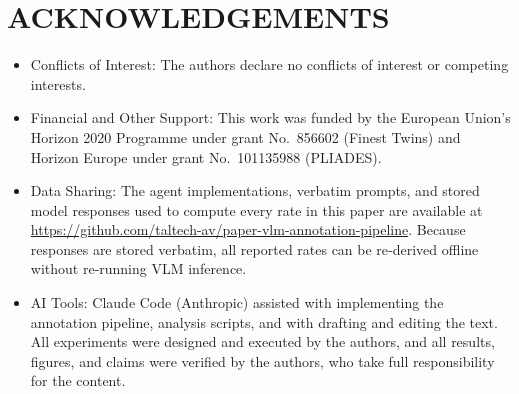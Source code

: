 \documentclass[a4paper,twoside]{article}
\begin{document}
\section*{\uppercase{Acknowledgements}}

\begin{itemize}
  \item Conflicts of Interest: The authors declare no conflicts of interest or competing interests.
  \item Financial and Other Support: This work was funded by the European Union’s Horizon 2020 Programme under grant No.\ 856602 (Finest Twins) and Horizon Europe under grant No.\ 101135988 (PLIADES).
  \item Data Sharing: The agent implementations, verbatim prompts, and stored model responses used to compute every rate in this paper are available at \url{https://github.com/taltech-av/paper-vlm-annotation-pipeline}. Because responses are stored verbatim, all reported rates can be re‑derived offline without re‑running VLM inference.
  \item AI Tools: Claude Code (Anthropic) assisted with implementing the annotation pipeline, analysis scripts, and with drafting and editing the text. All experiments were designed and executed by the authors, and all results, figures, and claims were verified by the authors, who take full responsibility for the content.
\end{itemize}



{\small
}
\end{document}
